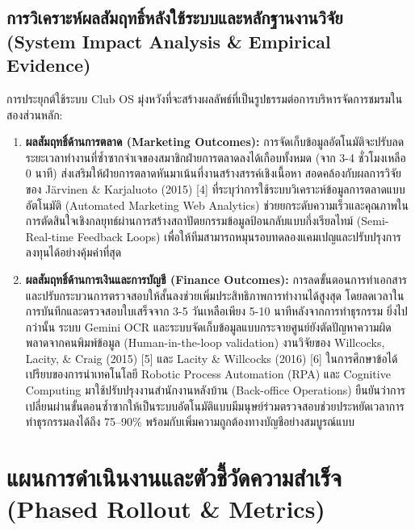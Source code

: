 \documentclass[10pt,a4paper]{article}
\begin{document}
\subsection{การวิเคราะห์ผลสัมฤทธิ์หลังใช้ระบบและหลักฐานงานวิจัย (System Impact Analysis \& Empirical Evidence)}
การประยุกต์ใช้ระบบ Club OS มุ่งหวังที่จะสร้างผลลัพธ์ที่เป็นรูปธรรมต่อการบริหารจัดการชมรมในสองส่วนหลัก:
\begin{enumerate}
  \item \textbf{ผลสัมฤทธิ์ด้านการตลาด (Marketing Outcomes):} การจัดเก็บข้อมูลอัตโนมัติจะปรับลดระยะเวลาทำงานที่ซ้ำซากจำเจของสมาชิกฝ่ายการตลาดลงได้เกือบทั้งหมด (จาก 3-4 ชั่วโมงเหลือ 0 นาที) ส่งเสริมให้ฝ่ายการตลาดหันมาเน้นที่งานสร้างสรรค์เชิงเนื้อหา สอดคล้องกับผลการวิจัยของ Järvinen \& Karjaluoto (2015) [4] ที่ระบุว่าการใช้ระบบวิเคราะห์ข้อมูลการตลาดแบบอัตโนมัติ (Automated Marketing Web Analytics) ช่วยยกระดับความเร็วและคุณภาพในการตัดสินใจเชิงกลยุทธ์ผ่านการสร้างสถาปัตยกรรมข้อมูลป้อนกลับแบบกึ่งเรียลไทม์ (Semi-Real-time Feedback Loops) เพื่อให้ทีมสามารถหมุนรอบทดลองแคมเปญและปรับปรุงการลงทุนได้อย่างคุ้มค่าที่สุด
  \item \textbf{ผลสัมฤทธิ์ด้านการเงินและการบัญชี (Finance Outcomes):} การลดขั้นตอนการทำเอกสารและปรับกระบวนการตรวจสอบให้สั้นลงช่วยเพิ่มประสิทธิภาพการทำงานได้สูงสุด โดยลดเวลาในการบันทึกและตรวจสอบใบเสร็จจาก 3-5 วันเหลือเพียง 5-10 นาทีหลังจากการทำธุรกรรม ยิ่งไปกว่านั้น ระบบ Gemini OCR และระบบจัดเก็บข้อมูลแบบกระจายศูนย์ยังตัดปัญหาความผิดพลาดจากคนพิมพ์ข้อมูล (Human-in-the-loop validation) งานวิจัยของ Willcocks, Lacity, \& Craig (2015) [5] และ Lacity \& Willcocks (2016) [6] ในการศึกษาข้อได้เปรียบของการนำเทคโนโลยี Robotic Process Automation (RPA) และ Cognitive Computing มาใช้ปรับปรุงงานสำนักงานหลังบ้าน (Back-office Operations) ยืนยันว่าการเปลี่ยนผ่านขั้นตอนซ้ำซากให้เป็นระบบอัตโนมัติแบบมีมนุษย์ร่วมตรวจสอบช่วยประหยัดเวลาการทำธุรกรรมลงได้ถึง 75--90\% พร้อมกับเพิ่มความถูกต้องทางบัญชีอย่างสมบูรณ์แบบ
\end{enumerate}

\newpage

\section{แผนการดำเนินงานและตัวชี้วัดความสำเร็จ (Phased Rollout \& Metrics)}
\end{document}
